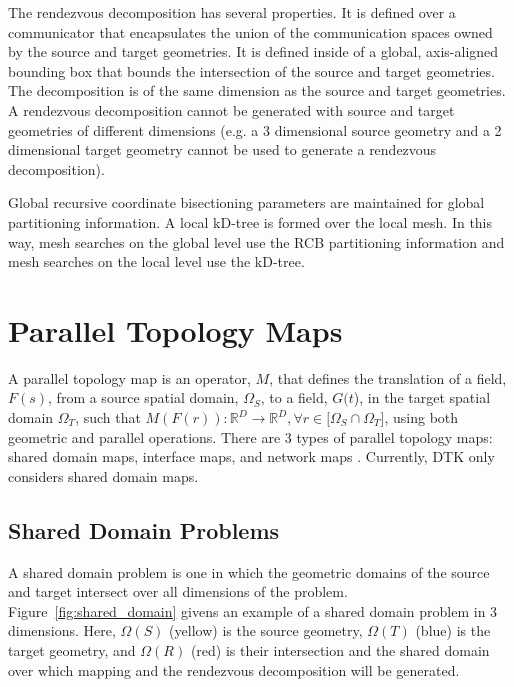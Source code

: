 \documentclass[letterpaper,12pt]{article}
\begin{document}
The rendezvous decomposition has several properties. It is defined
over a communicator that encapsulates the union of the communication
spaces owned by the source and target geometries. It is defined inside
of a global, axis-aligned bounding box that bounds the intersection of
the source and target geometries. The decomposition is of the same
dimension as the source and target geometries. A rendezvous
decomposition cannot be generated with source and target geometries of
different dimensions (e.g. a 3 dimensional source geometry and a 2
dimensional target geometry cannot be used to generate a rendezvous
decomposition). 

Global recursive coordinate bisectioning parameters
are maintained for global partitioning information. A local kD-tree is
formed over the local mesh. In this way, mesh searches on the global
level use the RCB partitioning information and mesh searches on the
local level use the kD-tree.

\clearpage

\section{Parallel Topology Maps}\label{sec:map}

A parallel topology map is an operator, $M$, that defines the
translation of a field, $F(s)$, from a source spatial domain,
$\Omega_S$, to a field, $G(t$), in the target spatial domain
$\Omega_T$, such that $M( F(r) ) : \mathbb{R}^D \rightarrow
\mathbb{R}^D, \forall r \in [\Omega_S \cap \Omega_T$], using both
geometric and parallel operations. There are 3 types of parallel
topology maps: shared domain maps, interface maps, and network maps
\cite{LIME_2011}. Currently, DTK only considers shared domain maps.

\subsection{Shared Domain Problems}\label{subsec:shared_domain}
A shared domain problem is one in which the geometric domains of the
source and target intersect over all dimensions of the
problem. Figure~\ref{fig:shared_domain} givens an example of a shared
domain problem in 3 dimensions. Here, $\Omega(S)$ (yellow) is the
source geometry, $\Omega(T)$ (blue) is the target geometry, and
$\Omega(R)$ (red) is their intersection and the shared domain over
which mapping and the rendezvous decomposition will be generated.
\end{document}
